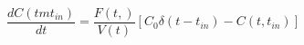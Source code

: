 \begin{equation}
\frac{dC(tmt_{in})}{dt} = \frac{F(t,)}{V(t)}[C_0\delta(t-t_{in})-C(t,t_{in})]
\end{equation}